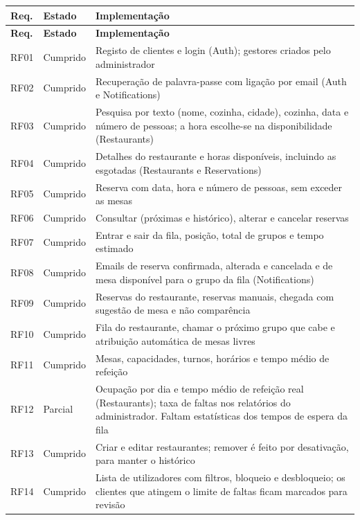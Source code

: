 \begin{longtable}{p{}p{}p{}}
\label{tab:rastreabilidade} \\
\toprule
\textbf{Req.} & \textbf{Estado} & \textbf{Implementação} \\
\midrule
\endfirsthead
\toprule
\textbf{Req.} & \textbf{Estado} & \textbf{Implementação} \\
\midrule
\endhead
\bottomrule
\endfoot
RF01 & Cumprido & Registo de clientes e login (Auth); gestores criados pelo administrador \\
RF02 & Cumprido & Recuperação de palavra-passe com ligação por email (Auth e Notifications) \\
RF03 & Cumprido & Pesquisa por texto (nome, cozinha, cidade), cozinha, data e número de pessoas;
a hora escolhe-se na disponibilidade (Restaurants) \\
RF04 & Cumprido & Detalhes do restaurante e horas disponíveis, incluindo as esgotadas
(Restaurants e Reservations) \\
RF05 & Cumprido & Reserva com data, hora e número de pessoas, sem exceder as mesas \\
RF06 & Cumprido & Consultar (próximas e histórico), alterar e cancelar reservas \\
RF07 & Cumprido & Entrar e sair da fila, posição, total de grupos e tempo estimado \\
RF08 & Cumprido & Emails de reserva confirmada, alterada e cancelada e de mesa disponível para o
grupo da fila (Notifications) \\
RF09 & Cumprido & Reservas do restaurante, reservas manuais, chegada com sugestão de mesa e não
comparência \\
RF10 & Cumprido & Fila do restaurante, chamar o próximo grupo que cabe e atribuição automática de
mesas livres \\
RF11 & Cumprido & Mesas, capacidades, turnos, horários e tempo médio de refeição \\
RF12 & Parcial & Ocupação por dia e tempo médio de refeição real (Restaurants); taxa de faltas
nos relatórios do administrador. Faltam estatísticas dos tempos de espera da fila \\
RF13 & Cumprido & Criar e editar restaurantes; remover é feito por desativação, para manter o
histórico \\
RF14 & Cumprido & Lista de utilizadores com filtros, bloqueio e desbloqueio; os clientes que
atingem o limite de faltas ficam marcados para revisão \\

\end{longtable}
